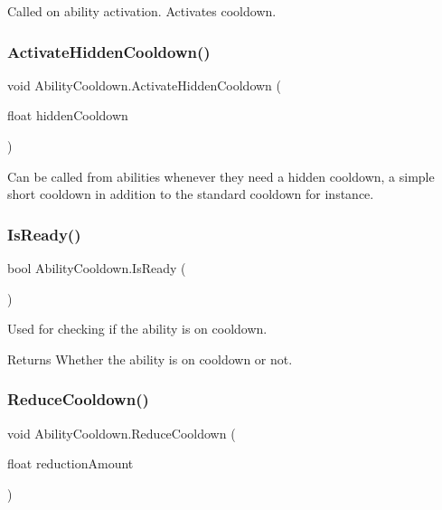 Called on ability activation. Activates cooldown. 

\hypertarget{class_ability_cooldown_a7423fa48fe64540ee2d08b16154673c0}{}\label{class_ability_cooldown_a7423fa48fe64540ee2d08b16154673c0} 
\subsubsection{\texorpdfstring{Activate\+Hidden\+Cooldown()}{ActivateHiddenCooldown()}}
{\footnotesize\ttfamily void Ability\+Cooldown.\+Activate\+Hidden\+Cooldown (\begin{DoxyParamCaption}\item[{float}]{hidden\+Cooldown }\end{DoxyParamCaption})}



Can be called from abilities whenever they need a hidden cooldown, a simple short cooldown in addition to the standard cooldown for instance. 

\hypertarget{class_ability_cooldown_a873d580a5eff83aaa450b8ffbd388f6d}{}\label{class_ability_cooldown_a873d580a5eff83aaa450b8ffbd388f6d} 
\subsubsection{\texorpdfstring{Is\+Ready()}{IsReady()}}
{\footnotesize\ttfamily bool Ability\+Cooldown.\+Is\+Ready (\begin{DoxyParamCaption}{ }\end{DoxyParamCaption})}



Used for checking if the ability is on cooldown. 

\begin{DoxyReturn}{Returns}
Whether the ability is on cooldown or not.
\end{DoxyReturn}
\hypertarget{class_ability_cooldown_abba8f163068aa6d9029a4138cacdacde}{}\label{class_ability_cooldown_abba8f163068aa6d9029a4138cacdacde} 
\subsubsection{\texorpdfstring{Reduce\+Cooldown()}{ReduceCooldown()}}
{\footnotesize\ttfamily void Ability\+Cooldown.\+Reduce\+Cooldown (\begin{DoxyParamCaption}\item[{float}]{reduction\+Amount }\end{DoxyParamCaption})}



